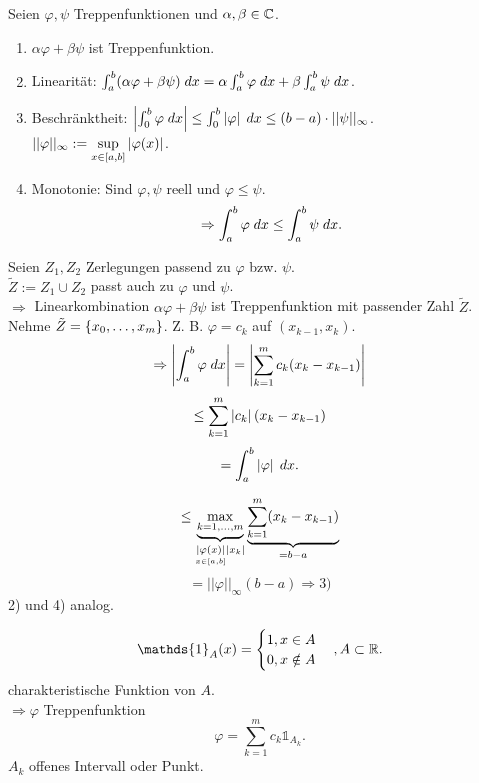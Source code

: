 \documentclass[../ana2.tex]{subfiles}
\begin{document}
\begin{lem}
    Seien \( \varphi, \psi \) Treppenfunktionen und 
    \( \alpha, \beta \in \C \).
    \begin{enumerate}
        \item \( \alpha \varphi + \beta \psi \) ist Treppenfunktion.
        \item Linearität: \( \integral{(\alpha \varphi + \beta \psi)}{a}{b} 
        = \alpha \integral{\varphi}{a}{b} 
        + \beta \integral{\psi}{a}{b} \).
        \item Beschränktheit: \( \abs{\integral{\varphi}{0}{b}}
        \leq \integral{\abs{\varphi}}{0}{b} \leq (b-a) \cdot ||\psi||_\infty \). \\
        \( ||\varphi||_\infty 
        := \underset{x \in [a,b]}{\sup} \abs{\varphi(x)} \).
        \item Monotonie: Sind \( \varphi, \psi \) reell und 
        \( \varphi \leq \psi \).
        \[ \Rightarrow \integral{\varphi}{a}{b} 
        \leq \integral{\psi}{a}{b}. \]
    \end{enumerate}    
\end{lem}
\begin{bew}
    Seien \( Z_1, Z_2 \) Zerlegungen passend zu \( \varphi \) bzw. 
    \( \psi \).\\
    \( \tilde{Z} := Z_1 \cup Z_2 \) passt auch zu \( \varphi \) und 
    \( \psi \).\\
    \( \Rightarrow \) Linearkombination \( \alpha \varphi + \beta \psi \) 
    ist Treppenfunktion mit passender Zahl \( \tilde{Z} \).\\
    Nehme \( \tilde{Z} = \set{x_0,\ldots, x_m} \).
    Z. B. \( \varphi = c_k \) auf \( (x_{k-1}, x_k) \).
    \[ \Rightarrow \abs{ \integral{\varphi}{a}{b} } 
    = \abs{\sum_{k=1}^m c_k (x_k - x_{k-1}) } \]
    \[ \leq \sum_{k=1}^m \abs{c_k} (x_k - x_{k-1}) \]
    \[ = \integral{\abs{\varphi}}{a}{b}. \]

    \[ \leq \underbrace{\underset{k=1,\dots,m}{\max}}
    _{\underset{x \in [a,b]}{\abs{\varphi(x)}} \abs{x_k}}
    \underbrace{\sum_{k=1}^m (x_k-x_{k-1})}_{=b-a} \]
    \[ = ||\varphi||_\infty (b-a) \Rightarrow \text{3)} \]
    2) und 4) analog.
\end{bew}
\begin{bem}
    \[ \mathds{1}_A (x) = \begin{cases}
        1, x \in A \\
        0, x \notin A
    \end{cases}, A\subset \R. \]
    charakteristische Funktion von \(A\).\\
    \( \Rightarrow \varphi \) Treppenfunktion
    \[ \varphi = \sum_{k=1}^m c_k \mathds{1}_{A_k}. \]
    \( A_k \) offenes Intervall oder Punkt.
\end{bem}
\end{document}

